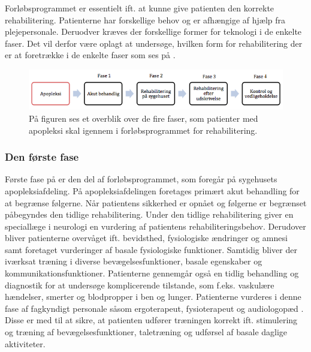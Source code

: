 Forløbsprogrammet er essentielt ift. at kunne give patienten den korrekte rehabilitering. Patienterne har forskellige behov og er afhængige af hjælp fra plejepersonale. Deruodver kræves der forskellige former for teknologi i de enkelte faser. Det vil derfor være oplagt at undersøge, hvilken form for rehabilitering der er at foretrække i de enkelte faser som ses på .

\begin{figure}[H]
	\centering
	\includegraphics[scale=1.2]{figures/bProblemanalyse/flowdiagram_faser1.png}
	\caption{På figuren ses et overblik over de fire faser, som patienter med apopleksi skal igennem i forløbsprogrammet for rehabilitering. \cite{Sundhedsstyrelsen2011a}} 
	\label{firefaser}
\end{figure}

\subsubsection{Den første fase}
Første fase på  er den del af forløbsprogrammet, som foregår på sygehusets apopleksiafdeling. På apopleksiafdelingen foretages primært akut behandling for at begrænse følgerne. Når patientens sikkerhed er opnået og følgerne er begrænset påbegyndes den tidlige rehabilitering. Under den tidlige rehabilitering giver en speciallæge i neurologi en vurdering af patientens rehabiliteringsbehov. Derudover bliver patienterne overvåget ift. bevidsthed, fysiologiske ændringer og amnesi samt foretaget vurderinger af basale fysiologiske funktioner. Samtidig bliver der iværksat træning i diverse bevægelsesfunktioner, basale egenskaber og kommunikationsfunktioner. Patienterne gennemgår også en tidlig behandling og diagnostik for at undersøge komplicerende tilstande, som f.eks. vaskulære hændelser, smerter og blodpropper i ben og lunger. Patienterne vurderes i denne fase af fagkyndigt personale såsom ergoterapeut, fysioterapeut og audiologopæd . Disse er med til at sikre, at patienten udfører træningen korrekt ift. stimulering og træning af bevægelsesfunktioner, taletræning og udførsel af basale daglige aktiviteter. \cite{Sundhedsstyrelsen2011a}

